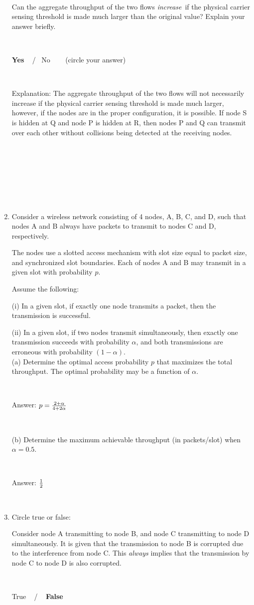 \documentclass[letterpaper, 12pt]{article}
\begin{document}
\begin{enumerate}
~

Can the aggregate throughput of the two flows
{\em increase}\, if the physical carrier sensing threshold is made much larger than the 
original value?
Explain your answer briefly.

~

\textbf{Yes} ~ / ~No ~~~ (circle your answer)


~

Explanation: The aggregate throughput of the two flows will not necessarily increase if the physical carrier sensing threshold is made much larger, however, if the nodes are in the proper configuration, it is possible. If node S is hidden at Q and node P is hidden at R, then nodes P and Q can transmit over each other without collisions being detected at the receiving nodes.


~

~

~

~


\item Consider a wireless network consisting of 4 nodes,
A, B, C, and D, such that nodes A and B always have packets to transmit
to nodes C and D, respectively.

The nodes use a slotted access mechanism with slot size
equal to packet size, and synchronized slot boundaries.
Each of nodes A and B may transmit in a given slot with
probability $p$.

Assume the following:

(i) In a given slot, if exactly one node transmits a packet, then
	the transmission is successful.

(ii) In a given slot, if two nodes transmit simultaneously, then
	exactly one transmission succeeds with probability
	$\alpha$, and both transmissions are erroneous with
	probability $(1-\alpha)$. \\

(a) Determine the optimal access probability $p$ that maximizes the total
throughput. The optimal probability may be a function of $\alpha$.

~


Answer: $p = {{2 + \alpha} \over {4 + 2\alpha}}$


~

(b) Determine the maximum achievable throughput (in packets/slot) 
	when $\alpha=0.5$.

~


Answer: $1 \over 2$


~



\item 
Circle true or false:

Consider node A transmitting to node B, and node C transmitting to
    node D simultaneously. It is given that the transmission to node B
    is corrupted due to the interference from node C. This {\em always} implies that
    the transmission by node C to node D is also corrupted.

~ 

True ~ / ~ \textbf{False}


\end{enumerate}
\end{document}
